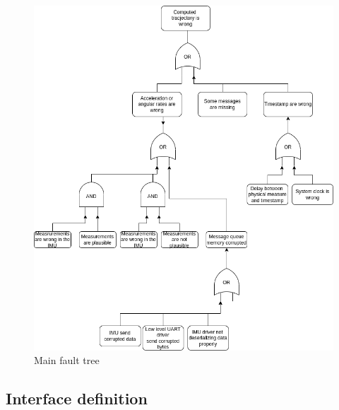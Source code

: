 \begin{figure}[H]
    \centering
    \includegraphics[width=1.0 \textwidth]{diagrams/main_fault_tree.drawio.png}
    \caption{Main fault tree}
    \label{fig-main-fault-tree}
\end{figure}


\subsection{Interface definition}
